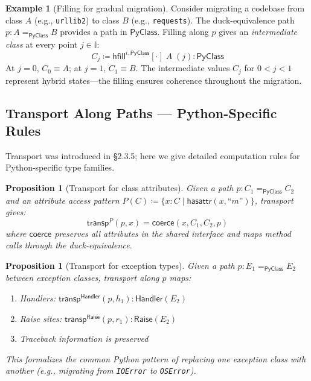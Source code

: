 \documentclass[11pt,a4paper]{report}
\theoremstyle{definition}
\newtheorem{example}[definition]{Example}
\theoremstyle{plain}
\newtheorem{proposition}[definition]{Proposition}
\newcommand{\PyClass}{\mathsf{PyClass}}
\newcommand{\interval}{\mathbb{I}}
\newcommand{\transp}{\mathsf{transp}}
\newcommand{\hfilling}{\mathsf{hfill}}
\newcommand{\defeq}{\coloneqq}
\begin{document}
\begin{example}[Filling for gradual migration]
\label{ex:filling-migration}
Consider migrating a codebase from class $A$ (e.g., \lstinline[style=python]{urllib2})
to class $B$ (e.g., \lstinline[style=python]{requests}).  The duck-equivalence
path $p : A =_{\PyClass} B$ provides a path in $\PyClass$.  Filling along $p$
gives an \emph{intermediate class} at every point $j \in \interval$:
\[
  C_j \defeq \hfilling^{i.\,\PyClass}[\cdot]\; A \;(j) : \PyClass
\]
At $j = 0$, $C_0 \equiv A$; at $j = 1$, $C_1 \equiv B$.  The intermediate
values $C_j$ for $0 < j < 1$ represent hybrid states---the filling ensures
coherence throughout the migration.
\end{example}


\subsection{Transport Along Paths --- Python-Specific Rules}

Transport was introduced in \S2.3.5; here we give detailed computation rules
for Python-specific type families.

\begin{proposition}[Transport for class attributes]
\label{prop:transport-attr}
Given a path $p : C_1 =_{\PyClass} C_2$ and an attribute access pattern
$P(C) \defeq \{x : C \mid \mathsf{hasattr}(x, \text{``}m\text{''}) \}$, transport gives:
\[
  \transp^P(p, x) = \mathsf{coerce}(x, C_1, C_2, p)
\]
where $\mathsf{coerce}$ preserves all attributes in the shared interface and maps
method calls through the duck-equivalence.
\end{proposition}

\begin{proposition}[Transport for exception types]
\label{prop:transport-exc}
Given a path $p : E_1 =_{\PyClass} E_2$ between exception classes, transport
along $p$ maps:
\begin{enumerate}
  \item Handlers: $\transp^{\mathsf{Handler}}(p, h_1) : \mathsf{Handler}(E_2)$
  \item Raise sites: $\transp^{\mathsf{Raise}}(p, r_1) : \mathsf{Raise}(E_2)$
  \item Traceback information is preserved
\end{enumerate}
This formalizes the common Python pattern of replacing one exception class with
another (e.g., migrating from \lstinline[style=python]{IOError} to
\lstinline[style=python]{OSError}).
\end{proposition}
\end{document}
